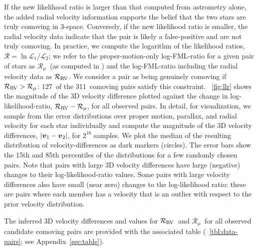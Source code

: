 \documentclass[modern, letterpaper]{aastex61}
\newcommand{\llrold}{\ensuremath{\mathcal{R}_\mu}}
\newcommand{\llrnew}{\ensuremath{\mathcal{R}_{\rm RV}}}
\newcommand{\npairsobs}{311}
\newcommand{\ncomoving}{127}
\begin{document}
If the new likelihood ratio is larger than that computed from astrometry alone,
the added radial velocity information supports the belief that the two stars are
truly comoving in 3-space.
Conversely, if the new likelihood ratio is smaller, the radial velocity data
indicate that the pair is likely a false-positive and are not truly comoving.
In practice, we compute the logarithm of the likelihood ratios,
$\mathcal{R} = \ln \mathcal{L}_1/\mathcal{L}_2$; we refer to the
proper-motion-only log-FML-ratio for a given pair of stars as
\llrold\ (as computed in \citealt{Oh:2017}) and the log-FML-ratio including the
radial velocity data as \llrnew.
We consider a pair as being genuinely comoving if $\llrnew > \llrold$:
\ncomoving\ of the \npairsobs\ comoving pairs satisfy this constraint.
\figurename~\ref{fig:llr} shows the magnitude of the 3D velocity difference
plotted against the change in log-likelihood-ratio, $\llrnew - \llrold$, for all
observed pairs.
In detail, for visualization, we sample from the error distributions over proper
motion, parallax, and radial velocity for each star individually and compute the
magnitude of the 3D velocity differences, $|\boldsymbol{v}_1-\boldsymbol{v}_2|$, for $2^{16}$
samples.
We plot the median of the resulting distribution of velocity-differences as
dark markers (circles).
The error bars show the 15th and 85th percentiles of the distributions for a few
randomly chosen pairs.
Note that pairs with large 3D velocity differences have large (negative) changes
to their log-likelihood-ratio values.
Some pairs with large velocity differences also have small (near zero) changes
to the log-likelihood ratio: these are pairs where each member has a velocity
that is an outlier with respect to the prior velocity distribution.

The inferred 3D velocity differences and values for \llrnew\ and \llrold\ for
all observed candidate comoving pairs are provided with the associated table
(\tablename~\ref{tbl:data-pairs}; see Appendix~\ref{sec:table}).
\end{document}
